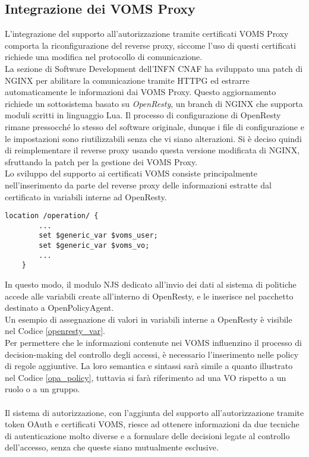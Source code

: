 \subsection{Integrazione dei VOMS Proxy}
L'integrazione del supporto all'autorizzazione tramite certificati VOMS Proxy comporta la riconfigurazione del reverse proxy, 
siccome l'uso di questi certificati richiede una modifica nel protocollo di comunicazione. 
\\ La sezione di Software Development dell'INFN CNAF ha sviluppato una patch di NGINX per abilitare la comunicazione 
tramite HTTPG ed estrarre automaticamente le informazioni dai VOMS Proxy.
Questo aggiornamento richiede un sottosistema basato su \textit{OpenResty}, un branch di NGINX che supporta moduli scritti in linguaggio Lua. 
Il processo di configurazione di OpenResty
 rimane pressocché lo stesso del software originale, dunque i file di configurazione e le impostazioni sono riutilizzabili 
senza che vi siano alterazioni. 
Si è deciso quindi di reimplementare il reverse proxy usando questa versione modificata di NGINX, sfruttando la patch per la gestione dei VOMS Proxy. 
\\ Lo sviluppo del supporto ai certificati VOMS consiste principalmente nell'inserimento da parte del reverse proxy 
delle informazioni estratte dal certificato in variabili interne ad OpenResty. 

\begin{lstlisting}[caption={Assegnazione di variabili in OpenResty},captionpos=b,label=openresty_var]
    location /operation/ {
        ...
        set $generic_var $voms_user;
        set $generic_var $voms_vo;
        ...
    }
\end{lstlisting}
In questo modo, il modulo NJS dedicato all'invio dei dati al sistema di politiche accede alle variabili create all'interno di OpenResty, 
e le inserisce nel pacchetto destinato a OpenPolicyAgent. 
\\Un esempio di assegnazione di valori in variabili interne a 
OpenResty è visibile nel Codice \ref{openresty_var}.
\\ Per permettere che le informazioni contenute nei VOMS influenzino il processo di decision-making del controllo degli accessi,
 è necessario l'inserimento nelle policy di regole aggiuntive. La loro semantica e sintassi sarà simile a quanto illustrato nel Codice \ref*{opa_policy},
tuttavia si farà riferimento ad una VO rispetto a un ruolo o a un gruppo.
\\ \\ Il sistema di autorizzazione, con l'aggiunta del supporto all'autorizzazione tramite token OAuth e certificati VOMS, riesce ad ottenere informazioni 
da due tecniche di autenticazione molto diverse e a formulare delle decisioni legate al controllo dell'accesso, senza che queste siano mutualmente esclusive. 

